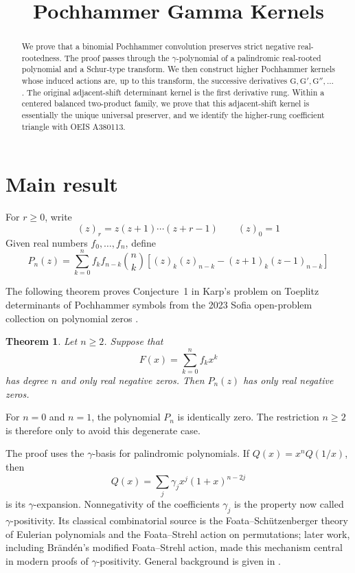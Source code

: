 \documentclass[a4paper,11pt,reqno]{amsart}
\title{Pochhammer Gamma Kernels}
\date{}
\numberwithin{equation}{section}
\newtheorem{theorem}{Theorem}
\theoremstyle{remark}
\newcommand{\Gpoly}{\mathrm{G}}     %
\begin{document}
\begin{abstract}
We prove that a binomial Pochhammer convolution preserves strict negative real-rootedness. The proof passes through the \(\gamma\)-polynomial of a palindromic real-rooted polynomial and a Schur-type transform. We then construct higher Pochhammer kernels whose induced actions are, up to this transform, the successive derivatives \(\Gpoly,\Gpoly',\Gpoly'',\ldots\). The original adjacent-shift determinant kernel is the first derivative rung. Within a centered balanced two-product family, we prove that this adjacent-shift kernel is essentially the unique universal preserver, and we identify the higher-rung coefficient triangle with OEIS A380113.
\end{abstract}

\maketitle

\section{Main result}

For \(r\geq0\), write
\[
  (z)_r=z(z+1)\cdots(z+r-1)
  \qquad (z)_0=1
\]
Given real numbers \(f_0,\ldots,f_n\), define
\begin{equation}\label{eq:Pn}
  P_n(z)=
  \sum_{k=0}^{n}
  f_kf_{n-k}\binom{n}{k}
  \left[
    (z)_k(z)_{n-k}-(z+1)_k(z-1)_{n-k}
  \right]
\end{equation}

The following theorem proves Conjecture~1 in Karp's problem on Toeplitz determinants of Pochhammer symbols from the 2023 Sofia open-problem collection on polynomial zeros \cite{KarpProblem2023}.

\begin{theorem}\label{thm:main}
Let \(n\geq2\). Suppose that
\[
  F(x)=\sum_{k=0}^{n}f_kx^k
\]
has degree \(n\) and only real negative zeros. Then \(P_n(z)\) has only real negative zeros.
\end{theorem}

For \(n=0\) and \(n=1\), the polynomial \(P_n\) is identically zero. The restriction \(n\geq2\) is therefore only to avoid this degenerate case.

The proof uses the \(\gamma\)-basis for palindromic polynomials. If \(Q(x)=x^nQ(1/x)\), then
\[
  Q(x)=\sum_j\gamma_jx^j(1+x)^{n-2j}
\]
is its \(\gamma\)-expansion. Nonnegativity of the coefficients \(\gamma_j\) is the property now called \(\gamma\)-positivity. Its classical combinatorial source is the Foata--Sch\"utzenberger theory of Eulerian polynomials and the Foata--Strehl action on permutations; later work, including Br\"and\'en's modified Foata--Strehl action, made this mechanism central in modern proofs of \(\gamma\)-positivity. General background is given in \cite{FoataSchutzenberger,FoataStrehl1974,FoataStrehl1976,Branden2008,Athanasiadis2018}.
\end{document}
